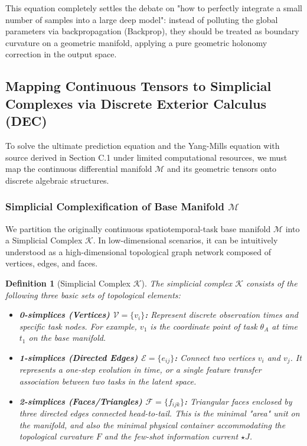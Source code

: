 \documentclass{article}
\newtheorem{definition}{Definition}[section]
\begin{document}
This equation completely settles the debate on "how to perfectly integrate a small number of samples into a large deep model": instead of polluting the global parameters via backpropagation (Backprop), they should be treated as boundary curvature on a geometric manifold, applying a pure geometric holonomy correction in the output space.
\subsection{Mapping Continuous Tensors to Simplicial Complexes via Discrete Exterior Calculus (DEC)}

To solve the ultimate prediction equation and the Yang-Mills equation with source derived in Section C.1 under limited computational resources, we must map the continuous differential manifold $\mathcal{M}$ and its geometric tensors onto discrete algebraic structures.

\subsubsection{Simplicial Complexification of Base Manifold \texorpdfstring{$\mathcal{M}$}{M}}

We partition the originally continuous spatiotemporal-task base manifold $\mathcal{M}$ into a Simplicial Complex $\mathcal{K}$. In low-dimensional scenarios, it can be intuitively understood as a high-dimensional topological graph network composed of vertices, edges, and faces.

\begin{definition}[Simplicial Complex $\mathcal{K}$]
The simplicial complex $\mathcal{K}$ consists of the following three basic sets of topological elements:
\begin{itemize}
    \item \textbf{0-simplices (Vertices) $\mathcal{V} = \{v_i\}$:} Represent discrete observation times and specific task nodes. For example, $v_1$ is the coordinate point of task $\theta_A$ at time $t_1$ on the base manifold.
    \item \textbf{1-simplices (Directed Edges) $\mathcal{E} = \{e_{ij}\}$:} Connect two vertices $v_i$ and $v_j$. It represents a one-step evolution in time, or a single feature transfer association between two tasks in the latent space.
    \item \textbf{2-simplices (Faces/Triangles) $\mathcal{F} = \{f_{ijk}\}$:} Triangular faces enclosed by three directed edges connected head-to-tail. This is the minimal "area" unit on the manifold, and also the minimal physical container accommodating the topological curvature $F$ and the few-shot information current $\star J$.
\end{itemize}
\end{definition}
\end{document}
